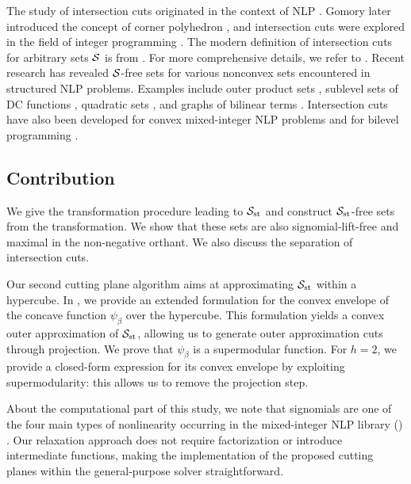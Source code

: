 The study of intersection cuts originated in the context of NLP \cite{thy1985}. Gomory later introduced the concept of corner polyhedron \cite{gomory1969some}, and intersection cuts were explored in the field of integer programming \cite{balas1971}. The modern definition of intersection cuts for arbitrary sets $\mathcal S$ is from \cite{dey2008, glover1973}. For more comprehensive details, we refer to \cite{andersen2010, basu2010, basu2019, cornuejols2015sufficiency, del2012relaxations, dey2008, richard2010group}. Recent research has revealed $\mathcal S$-free sets for various nonconvex sets encountered in structured NLP problems. Examples include outer product sets \cite{bienstock2019}, sublevel sets of DC functions \cite{serrano2019}, quadratic sets \cite{munoz2020maximal}, and graphs of bilinear terms \cite{fischetti2020}. Intersection cuts  have also been developed for convex mixed-integer NLP problems \cite{andersen2007, belotti2015conic, klnc-karzan2015, kilinc-karzan2016, modaresi2016} and for bilevel programming \cite{fischetti2018}.






\subsection{Contribution}


We give the transformation procedure leading to $\mathcal S_{\mathrm{st}}$ and construct $\mathcal S_{\mathrm{st}}$-free sets from the transformation. We show that these sets are also signomial-lift-free and maximal in the non-negative orthant. We also discuss the separation of intersection cuts. 

Our second cutting plane algorithm aims at approximating $\mathcal S_{\mathrm{st}}$ within a hypercube.  In , we provide an extended formulation for the convex envelope of the concave function $\psi_{\beta}$ over the hypercube. This formulation yields a convex outer approximation of $\mathcal S_{\mathrm{st}}$, allowing us to generate outer approximation cuts  through projection. We prove that $\psi_{\beta}$ is a supermodular function. For $h=2$, we provide a closed-form expression for its convex envelope by exploiting supermodularity: this allows us to remove the projection step.


About the computational part of this study, we note that signomials are one of the four main types of nonlinearity occurring in the mixed-integer NLP library (\minlplib) \cite{minlpsurveyAN, minlplib}. Our relaxation approach does not require factorization or introduce intermediate functions, making the implementation of the proposed cutting planes within the general-purpose solver \scip straightforward.



